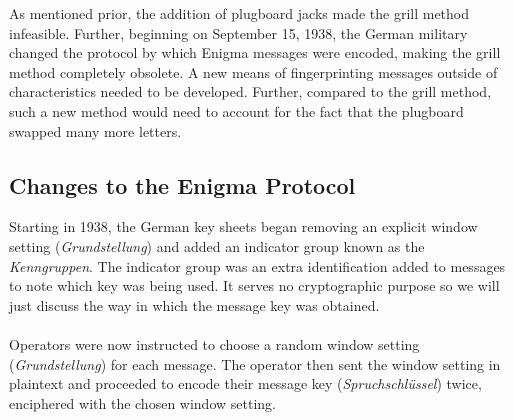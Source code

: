 As mentioned prior, the addition of plugboard jacks made the grill method infeasible.
Further, beginning on September 15, 1938, the German military changed the protocol by which Enigma messages were encoded, making the grill method completely obsolete. A new means of fingerprinting messages outside of characteristics needed to be developed. Further, compared to the grill method, such a new method would need to account for the fact that the plugboard swapped many more letters.


\subsection{Changes to the Enigma Protocol}

Starting in 1938, the German key sheets began removing an explicit window setting (\emph{Grundstellung}) and added an indicator group known as the \emph{Kenngruppen}. The indicator group was an extra identification added to messages to note which key was being used. It serves no cryptographic purpose so we will just discuss the way in which the message key was obtained.
\\\\Operators were now instructed to choose a random window setting (\emph{Grundstellung}) for each message. The operator then sent the window setting in plaintext and proceeded to encode their message key (\emph{Spruchschlüssel}) twice, enciphered with the chosen window setting. %

